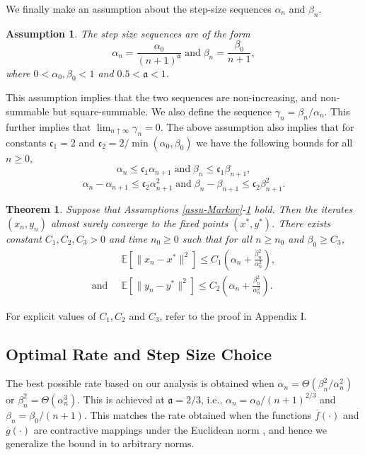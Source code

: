 \documentclass[letterpaper, 10 pt, conference]{ieeeconf}  %
\theoremstyle{definition}
\theoremstyle{plain}
\newtheorem{assumption}{Assumption}
\newtheorem{theorem}{Theorem}
\newcommand{\barf}{\overline{f}}
\newcommand{\barg}{\overline{g}}
\newcommand{\xstar}{x^*}
\newcommand{\ystar}{y^*}
\newcommand{\EE}{\mathbb{E}}
\newcommand{\cc}{\mathfrak{c}}
\newcommand{\afrak}{\mathfrak{a}}
\begin{document}
We finally make an assumption about the step-size sequences $\alpha_n$ and $\beta_n$.
\begin{assumption}\label{assu-stepsize}
The step size sequences are of the form $$\alpha_n=\frac{\alpha_0}{(n+1)^{\afrak}}\;\text{and}\;\beta_n=\frac{\beta_0}{n+1},$$
where $0<\alpha_0,\beta_0<1$ and $0.5<\afrak<1$. 
\end{assumption}
This assumption implies that the two sequences are non-increasing, and non-summable but square-summable. We also define the sequence $\gamma_n=\beta_n/\alpha_n$. This further implies that $\lim_{n\uparrow \infty}\gamma_n=0$. 
The above assumption also implies that for constants $\cc_1=2$ and $\cc_2=2/\min(\alpha_0, \beta_0)$ we have the following bounds for all $n\geq 0$,
$$\alpha_n\leq \cc_1\alpha_{n+1}\;\text{and}\;\beta_n\leq \cc_1\beta_{n+1},$$
$$\alpha_{n}-\alpha_{n+1}\leq \cc_2\alpha_{n+1}^2\;\text{and}\;\beta_{n}-\beta_{n+1}\leq \cc_2\beta_{n+1}^2.$$

\begin{theorem}\label{thm:expectation-bound}
    Suppose that Assumptions \ref{assu-Markov}-\ref{assu-stepsize} hold. Then the iterates $(x_n,y_n)$ almost surely converge to the fixed points $(\xstar,\ystar)$. There exists constant $C_1,C_2,C_3>0$ and time $n_0\geq 0$ such that for all $n\geq n_0$ and $\beta_0\geq C_3$,
    \begin{align*}
        &\EE\left[\|x_n-\xstar\|^2\right]\leq C_1\left(\alpha_n+\frac{\beta_n^2}{\alpha_n^2}\right),\\
    \text{and}\;\;&\EE\left[\|y_n-\ystar\|^2\right]\leq C_2\left(\alpha_n+\frac{\beta_n^2}{\alpha_n^2}\right).
    \end{align*}
\end{theorem}
For explicit values of $C_1,C_2$ and $C_3$, refer to the proof in Appendix I.

\subsection{Optimal Rate and Step Size Choice}\label{subsec:step_choice}
The best possible rate based on our analysis is obtained when $\alpha_n=\Theta(\beta_n^2/\alpha_n^2)$ or $\beta_n^2=\Theta(\alpha_n^3)$. This is achieved at $\afrak=2/3$, i.e., $\alpha_n=\alpha_0/(n+1)^{2/3}$ and $\beta_n=\beta_0/(n+1)$. This matches the rate obtained when the functions $\barf(\cdot)$ and $\barg(\cdot)$ are contractive mappings under the Euclidean norm \cite{Doan}, and hence we generalize the bound in \cite{Doan} to arbitrary norms.
\end{document}
